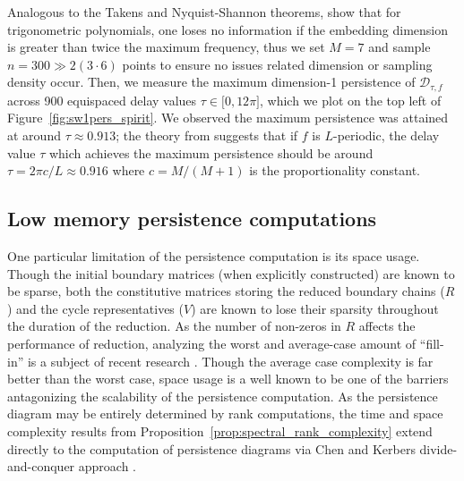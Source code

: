 \documentclass[pdflatex,sn-mathphys-num]{sn-jnl}
\begin{document}
Analogous to the Takens and Nyquist-Shannon theorems, \cite{perea2015sliding} show that for trigonometric polynomials, one loses no information if the embedding dimension is greater than twice the maximum frequency, thus we set \(M = 7\) and sample \(n = 300 \gg 2(3 \cdot 6)\) points to ensure no issues related dimension or sampling density occur. Then, we measure the maximum dimension-1 persistence of \(\mathcal{D}_{\tau,f}\) across 900 equispaced delay values \(\tau \in \lbrack 0,12\pi\rbrack\), which we plot on the top left of Figure~\ref{fig:sw1pers_spirit}. We observed the maximum persistence was attained at around \(\tau \approx 0.913\); the theory from \cite{perea2015sliding} suggests that if \(f\) is \(L\)-periodic, the delay value \(\tau\) which achieves the maximum persistence should be around \(\tau = 2\pi c/L \approx 0.916\) where \(c = M/(M + 1)\) is the proportionality constant.

\subsection{Low memory persistence computations}\label{sec:low_memory}

One particular limitation of the persistence computation is its space usage. Though the initial boundary matrices (when explicitly constructed) are known to be sparse, both the constitutive matrices storing the reduced boundary chains (\(R\)) and the cycle representatives (\(V\)) are known to lose their sparsity throughout the duration of the reduction. As the number of non-zeros in \(R\) affects the performance of reduction, analyzing the worst and average-case amount of ``fill-in'' is a subject of recent research \cite{bauer2022keeping}. Though the average case complexity is far better than the worst case, space usage is a well known to be one of the barriers antagonizing the scalability of the persistence computation. As the persistence diagram may be entirely determined by rank computations, the time and space complexity results from Proposition~\ref{prop:spectral_rank_complexity} extend directly to the computation of persistence diagrams via Chen and Kerbers divide-and-conquer approach \cite{chen2013output}.
\end{document}
